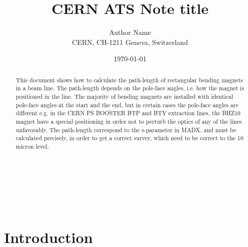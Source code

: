 \documentclass{cernatsnote}
\title{CERN ATS Note title}
\author{
	Author Name \; \\		
	CERN, CH-1211 Geneva, Switzerland
}
\date{\today}
\begin{document}
\maketitle

\begin{abstract}
This document shows how to calculate the path-length of rectangular bending magnets in a beam line. The path-length depends on the pole-face angles, i.e. how the magnet is positioned in the line. The majority of bending magnets are installed with identical pole-face angles at the start and the end, but in certain cases the pole-face angles are different e.g. in the CERN PS BOOSTER BTP and BTY extraction lines, the BHZ10 magnet have a special positioning in order not to perturb the optics of any of the lines unfavorably.
 The path-length correspond to the s-parameter in MADX, and must be calculated precisely, in order to get a correct survey, which need to be correct to the 10 micron level.
\end{abstract}
\\ \\ \\ 

\begingroup
\color{black}
\tableofcontents
\endgroup

\pagebreak

\section{Introduction}




\end{document}
